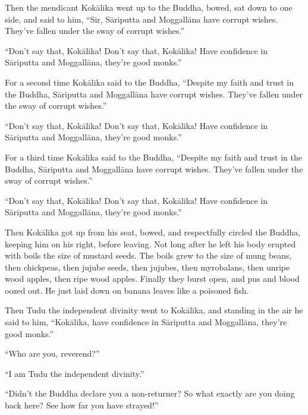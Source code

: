 \documentclass[12pt,openany]{book}%
\begin{document}
Then the mendicant \textsanskrit{Kokālika} went up to the Buddha, bowed, sat down to one side, and said to him, “Sir, \textsanskrit{Sāriputta} and \textsanskrit{Moggallāna} have corrupt wishes. They’ve fallen under the sway of corrupt wishes.” 

“Don’t say that, \textsanskrit{Kokālika}! Don’t say that, \textsanskrit{Kokālika}! Have confidence in \textsanskrit{Sāriputta} and \textsanskrit{Moggallāna}, they’re good monks.” 

For a second time \textsanskrit{Kokālika} said to the Buddha, “Despite my faith and trust in the Buddha, \textsanskrit{Sāriputta} and \textsanskrit{Moggallāna} have corrupt wishes. They’ve fallen under the sway of corrupt wishes.” 

“Don’t say that, \textsanskrit{Kokālika}! Don’t say that, \textsanskrit{Kokālika}! Have confidence in \textsanskrit{Sāriputta} and \textsanskrit{Moggallāna}, they’re good monks.” 

For a third time \textsanskrit{Kokālika} said to the Buddha, “Despite my faith and trust in the Buddha, \textsanskrit{Sāriputta} and \textsanskrit{Moggallāna} have corrupt wishes. They’ve fallen under the sway of corrupt wishes.” 

“Don’t say that, \textsanskrit{Kokālika}! Don’t say that, \textsanskrit{Kokālika}! Have confidence in \textsanskrit{Sāriputta} and \textsanskrit{Moggallāna}, they’re good monks.” 

Then \textsanskrit{Kokālika} got up from his seat, bowed, and respectfully circled the Buddha, keeping him on his right, before leaving. Not long after he left his body erupted with boils the size of mustard seeds. The boils grew to the size of mung beans, then chickpeas, then jujube seeds, then jujubes, then myrobalans, then unripe wood apples, then ripe wood apples. Finally they burst open, and pus and blood oozed out. He just laid down on banana leaves like a poisoned fish. 

Then Tudu the independent divinity went to \textsanskrit{Kokālika}, and standing in the air he said to him, “\textsanskrit{Kokālika}, have confidence in \textsanskrit{Sāriputta} and \textsanskrit{Moggallāna}, they’re good monks.” 

“Who are you, reverend?” 

“I am Tudu the independent divinity.” 

“Didn’t the Buddha declare you a non-returner? So what exactly are you doing back here? See how far you have strayed!” 
\end{document}
